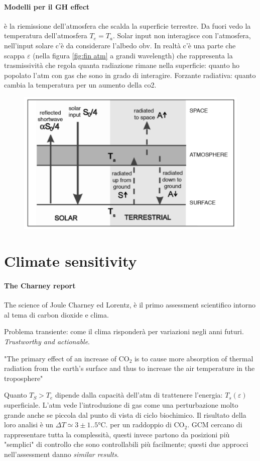 \paragraph{Modelli per il GH effect}
è la riemissione dell'atmosfera che scalda la superficie terrestre. Da fuori vedo la temperatura dell'atmosfera $T_e=T_a$. Solar input non interagisce con l'atmosfera, nell'input solare c'è da considerare l'albedo obv. In realtà c'è una parte che scappa $\varepsilon$ (nella figura \ref{fig:fin atm} a grandi wavelength) che rappresenta la trasmissività che regola quanta radiazione rimane nella superficie: quanto ho popolato l'atm con gas che sono in grado di interagire. Forzante radiativa: quanto cambia la temperatura per un aumento della co2.
\begin{figure}[htpb]
    \centering
    \includegraphics[width=0.5\linewidth]{uploads/GH effect.png}
\end{figure}
\section{Climate sensitivity}
\paragraph{The Charney report} The science of Joule Charney ed Lorentz, è il primo assessment scientifico intorno al tema di carbon dioxide e clima.

Problema transiente: come il clima risponderà per variazioni negli anni futuri. \textit{Trustworthy and actionable}.
\begin{center}
    "The primary effect of an increase of CO$_2$ is to cause more absorption of thermal radiation from the earth's surface and thus to increase the air temperature in the troposphere"
\end{center}
Quanto $T_S>T_e$ dipende dalla capacità dell'atm di trattenere l'energia: $T_s(\varepsilon)$ superficiale. L'atm vede l'introduzione di gas come una perturbazione molto grande anche se piccola dal punto di vista di ciclo biochimico. Il risultato della loro analisi è un $\Delta T\simeq 3\pm 1..5$°C. per un raddoppio di CO$_2$. 
GCM cercano di rappresentare tutta la complessità, questi invece partono da posizioni più "semplici" di controllo che sono controllabili più facilmente; questi due approcci nell'assessment danno \textit{similar results}. 
